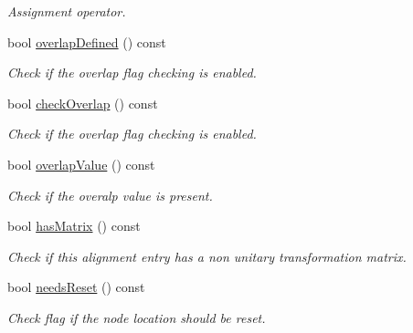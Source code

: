 \begin{DoxyCompactItemize}
\begin{DoxyCompactList}\small\item\em Assignment operator. \item\end{DoxyCompactList}\item 
bool \hyperlink{struct_d_d4hep_1_1_alignments_1_1_alignment_stack_1_1_stack_entry_a6a601285c13f0dc1beb95edd6c1d26ba}{overlapDefined} () const 
\begin{DoxyCompactList}\small\item\em Check if the overlap flag checking is enabled. \item\end{DoxyCompactList}\item 
bool \hyperlink{struct_d_d4hep_1_1_alignments_1_1_alignment_stack_1_1_stack_entry_a9d5a991296bc17452aa59fa2a49730f0}{checkOverlap} () const 
\begin{DoxyCompactList}\small\item\em Check if the overlap flag checking is enabled. \item\end{DoxyCompactList}\item 
bool \hyperlink{struct_d_d4hep_1_1_alignments_1_1_alignment_stack_1_1_stack_entry_a56268e20d98f780ae8d6c21ce183ab43}{overlapValue} () const 
\begin{DoxyCompactList}\small\item\em Check if the overalp value is present. \item\end{DoxyCompactList}\item 
bool \hyperlink{struct_d_d4hep_1_1_alignments_1_1_alignment_stack_1_1_stack_entry_a7625b59366463484cdc705d0fad3e3f5}{hasMatrix} () const 
\begin{DoxyCompactList}\small\item\em Check if this alignment entry has a non unitary transformation matrix. \item\end{DoxyCompactList}\item 
bool \hyperlink{struct_d_d4hep_1_1_alignments_1_1_alignment_stack_1_1_stack_entry_a6aacb14e3c417fcefca33ddc072fa00f}{needsReset} () const 
\begin{DoxyCompactList}\small\item\em Check flag if the node location should be reset. \item\end{DoxyCompactList}\item 

\end{DoxyCompactItemize}
